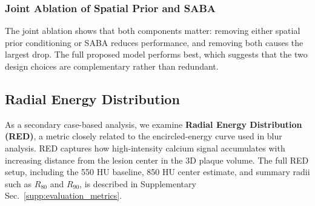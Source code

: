 \documentclass[singleLetter,times]{sagej}
\begin{document}
\subsubsection{Joint Ablation of Spatial Prior and SABA}

\begin{table}[t]
\centering
\caption{Joint ablation of spatial prior and SABA for the proposed model. Metrics are aggregated over 232 unique 3D test cases from two held-out subjects; each case has a distinct plaque, anatomical background, calcium concentration, and exposure/noise combination. Fixed HU thresholds are used: calcium core $>850$ HU and annulus $(550,850]$ HU.}
\label{tab:combined_ablation}
\end{table}

The joint ablation shows that both components matter: removing either spatial prior conditioning or SABA reduces performance, and removing both causes the largest drop. The full proposed model performs best, which suggests that the two design choices are complementary rather than redundant.

\subsection{Radial Energy Distribution}

As a secondary case-based analysis, we examine \textbf{Radial Energy Distribution (RED)}, a metric closely related to the encircled-energy curve used in blur analysis. RED captures how high-intensity calcium signal accumulates with increasing distance from the lesion center in the 3D plaque volume. The full RED setup, including the 550 HU baseline, 850 HU center estimate, and summary radii such as $R_{80}$ and $R_{90}$, is described in Supplementary Sec.~\ref{supp:evaluation_metrics}.
\end{document}
